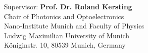 \thispagestyle{empty}


\begin{flushleft}
    {\large
     Supervisor: \textbf{Prof. Dr. Roland Kersting} \\[1mm]
     Chair of Photonics and Optoelectronics \\
     Nano-Institute Munich and Faculty of Physics \\
     Ludwig Maximilian University of Munich \\
     Königinstr. 10, 80539 Munich, Germany \\
     }
\end{flushleft}

\clearpage
\thispagestyle{empty}
